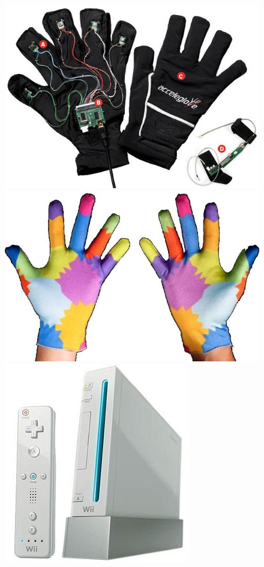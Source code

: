 \begin{figure}[h!]
\centering 

\begin{subfigure}\par\medskip 
{\includegraphics[scale=.25]{./Figures/Dataglove.jpg}\label{fig:Modelos:1}}   \qquad
{\includegraphics[scale=.20]{./Figures/colorGloves.jpg}\label{fig:Modelos:2}} \qquad   
{\includegraphics[scale=.28]{./Figures/wii.jpg}\label{fig:Modelos:3}}   
\caption{}
\end{subfigure}  


\end{figure}

